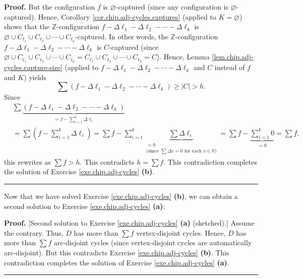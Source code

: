 \documentclass[numbers=enddot,12pt,final,onecolumn,notitlepage]{scrartcl}%
\theoremstyle{definition}
\newenvironment{proof}[1][Proof]{\noindent\textbf{#1.} }{\ \rule{0.5em}{0.5em}}
\let\sumnonlimits\sum
\renewcommand{\sum}{\sumnonlimits\limits}
\newcommand{\ZZ}{\mathbb{Z}}
\begin{document}
\begin{proof}
But the configuration $f$ is $\varnothing$-captured (since any configuration
is $\varnothing$-captured). Hence, Corollary
\ref{cor.chip.adj-cycles.captures} (applied to $K=\varnothing$) shows that the
$\ZZ$-configuration $f-\Delta\ell_{1}-\Delta\ell_{2}-\cdots-\Delta\ell_{k}$ is
$\varnothing\cup C_{\ell_{1}}\cup C_{\ell_{2}}\cup\cdots\cup C_{\ell_{k}}%
$-captured. In other words, the $\ZZ$-configuration $f-\Delta\ell_{1}-\Delta\ell
_{2}-\cdots-\Delta\ell_{k}$ is $C$-captured (since $\varnothing\cup
C_{\ell_{1}}\cup C_{\ell_{2}}\cup\cdots\cup C_{\ell_{k}}=C_{\ell_{1}}\cup
C_{\ell_{2}}\cup\cdots\cup C_{\ell_{k}}=C$). Hence, Lemma
\ref{lem.chip.adj-cycles.capture-size} (applied to $f-\Delta\ell_{1}-\Delta\ell
_{2}-\cdots-\Delta\ell_{k}$ and $C$ instead of $f$ and $K$) yields%
\[
\sum\left(  f-\Delta\ell_{1}-\Delta\ell_{2}-\cdots-\Delta\ell_{k}\right)
\geq\left\vert C\right\vert >h.
\]
Since%
\begin{align*}
& \sum\underbrace{\left(  f-\Delta\ell_{1}-\Delta\ell_{2}-\cdots-\Delta
\ell_{k}\right)  }_{=f-\sum_{i=1}^{k}\Delta\ell_{i}}\\
& =\sum\left(  f-\sum_{i=1}^{k}\Delta\ell_{i}\right)  =\sum f-\sum_{i=1}%
^{k}\underbrace{\sum\Delta\ell_{i}}_{\substack{=0\\\text{(since }\sum\Delta
v=0\text{ for each }v\in V\text{)}}}=\sum f-\underbrace{\sum_{i=1}^{k}0}%
_{=0}=\sum f,
\end{align*}
this rewrites as $\sum f>h$. This contradicts $h=\sum f$. This contradiction
completes the solution of Exercise \ref{exe.chip.adj-cycles} \textbf{(b)}.
\end{proof}

Now that we have solved Exercise \ref{exe.chip.adj-cycles} \textbf{(b)}, we
can obtain a second solution to Exercise \ref{exe.chip.adj-cycles}
\textbf{(a)}:

\begin{proof}
[Second solution to Exercise \ref{exe.chip.adj-cycles} \textbf{(a)} (sketched).]
Assume the contrary. Thus, $D$ has more than $\sum f$ vertex-disjoint cycles.
Hence, $D$ has more than $\sum f$ arc-disjoint cycles (since vertex-disjoint
cycles are automatically arc-disjoint). But this contradicts Exercise
\ref{exe.chip.adj-cycles} \textbf{(b)}.  This contradiction completes the
solution of Exercise \ref{exe.chip.adj-cycles} \textbf{(a)}.
\end{proof}
\end{document}
